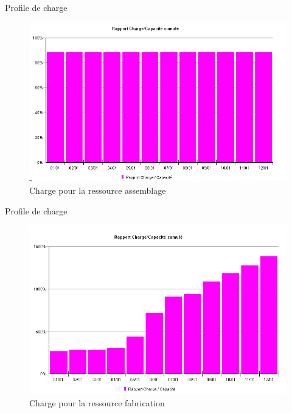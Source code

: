 
\begin{frame}{Profile de charge}
\begin{figure}[H]
\centering
\includegraphics[scale=0.4]{../Organisationnelle/captures/charge_assemblage.PNG}
\caption{Charge pour la ressource assemblage}
\end{figure}
\end{frame}

\begin{frame}{Profile de charge}
\begin{figure}[H]
\centering
\includegraphics[scale=0.4]{../Organisationnelle/captures/charge_fab.PNG}
\caption{Charge pour la ressource fabrication}
\end{figure}
\end{frame}


